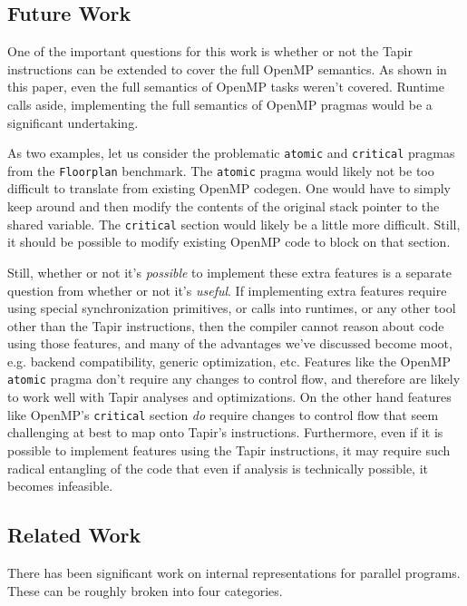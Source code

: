 \documentclass[sigconf]{acmart}
\begin{document}
\subsection{Future Work} \label{Sec:Future}

One of the important questions for this work is whether or not the Tapir
instructions can be extended to cover the full OpenMP semantics. As shown
in this paper, even the full semantics of OpenMP tasks weren't covered. Runtime
calls aside, implementing the full semantics of OpenMP pragmas would be a 
significant undertaking.

As two examples, let us consider the problematic \texttt{atomic} and
\texttt{critical} pragmas from the \texttt{Floorplan} benchmark. The 
\texttt{atomic} pragma would likely not be too difficult to translate
from existing OpenMP codegen. One would have to simply keep around and then
modify the contents of the original stack pointer to the shared variable. The
\texttt{critical} section would likely be a little more difficult. Still, it
should be possible to modify existing OpenMP code to block on that section. 

Still, whether or not it's \emph{possible} to implement these extra features
is a separate question from whether or not it's \emph{useful}. If implementing
extra features require using special synchronization primitives, or calls into
runtimes, or any other tool other than the Tapir instructions, then the
compiler cannot reason about code using those features, and many of the
advantages we've discussed become moot, e.g. backend compatibility, generic 
optimization, etc. Features like the OpenMP \texttt{atomic} pragma don't 
require any changes to control flow, and therefore are likely to work well 
with Tapir analyses and optimizations. On the other hand features like OpenMP's
\texttt{critical} section \emph{do} require changes to control flow that seem
challenging at best to map onto Tapir's instructions. Furthermore, even if it
is possible to implement features using the Tapir instructions, it may require 
such radical entangling of the code that even if analysis is technically
possible, it becomes infeasible. 

\subsection{Related Work} \label{Sec:Related}

There has been significant work on internal representations for parallel
programs. These can be roughly broken into four categories. 
\end{document}
